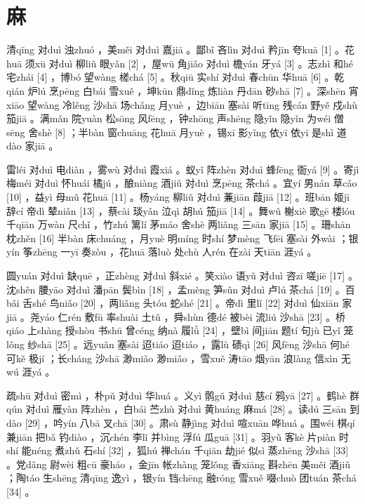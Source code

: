 \documentclass[12pt,UTF8]{ctexbook}
\begin{document}
\chapter{麻}


清qīng 对duì 浊zhuó ，美měi 对duì 嘉jiā 。鄙bǐ 吝lìn 对duì 矜jīn 夸kuā [1] 。花huā 须xū 对duì 柳liǔ 眼yǎn [2] ，屋wū 角jiǎo 对duì 檐yán 牙yá [3] 。志zhì 和hé 宅zhái [4] ，博bó 望wàng 槎chá [5] 。秋qiū 实shí 对duì 春chūn 华huā [6] 。乾qián 炉lú 烹pēng 白bái 雪xuě ，坤kūn 鼎dǐng 炼liàn 丹dān 砂shā [7] 。深shēn 宵xiāo 望wàng 冷lěng 沙shā 场chǎng 月yuè ，边biān 塞sài 听tīng 残cán 野yě 戍shù 笳jiā 。满mǎn 院yuàn 松sōng 风fēng ，钟zhōng 声shēng 隐yǐn 隐yǐn 为wéi 僧sēng 舍shè [8] ；半bàn 窗chuāng 花huā 月yuè ，锡xī 影yǐng 依yī 依yī 是shì 道dào 家jiā 。

雷léi 对duì 电diàn ，雾wù 对duì 霞xiá 。蚁yǐ 阵zhèn 对duì 蜂fēng 衙yá [9] 。寄jì 梅méi 对duì 怀huái 橘jú ，酿niàng 酒jiǔ 对duì 烹pēng 茶chá 。宜yí 男nán 草cǎo [10] ，益yì 母mǔ 花huā [11] 。杨yáng 柳liǔ 对duì 蒹jiān 葭jiā [12] 。班bān 姬jī 辞cí 帝dì 辇niǎn [13] ，蔡cài 琰yǎn 泣qì 胡hú 笳jiā [14] 。舞wǔ 榭xiè 歌gē 楼lóu 千qiān 万wàn 尺chǐ ，竹zhú 篱lí 茅máo 舍shè 两liǎng 三sān 家jiā [15] 。珊shān 枕zhěn [16] 半bàn 床chuáng ，月yuè 明míng 时shí 梦mèng 飞fēi 塞sài 外wài ；银yín 筝zhēng 一yī 奏zòu ，花huā 落luò 处chù 人rén 在zài 天tiān 涯yá 。

圆yuán 对duì 缺quē ，正zhèng 对duì 斜xié 。笑xiào 语yǔ 对duì 咨zī 嗟jiē [17] 。沈shěn 腰yāo 对duì 潘pān 鬓bìn [18] ，孟mèng 笋sǔn 对duì 卢lú 茶chá [19] 。百bǎi 舌shé 鸟niǎo [20] ，两liǎng 头tóu 蛇shé [21] 。帝dì 里lǐ [22] 对duì 仙xiān 家jiā 。尧yáo 仁rén 敷fū 率shuài 土tǔ ，舜shùn 德dé 被bèi 流liú 沙shā [23] 。桥qiáo 上shàng 授shòu 书shū 曾céng 纳nà 履lǚ [24] ，壁bì 间jiān 题tí 句jù 已yǐ 笼lǒng 纱shā [25] 。远yuǎn 塞sài 迢tiáo 迢tiáo ，露lù 碛qì [26] 风fēng 沙shā 何hé 可kě 极jí ；长cháng 沙shā 渺miǎo 渺miǎo ，雪xuě 涛tāo 烟yān 浪làng 信xìn 无wú 涯yá 。

疏shū 对duì 密mì ，朴pǔ 对duì 华huá 。义yì 鹘gǔ 对duì 慈cí 鸦yā [27] 。鹤hè 群qún 对duì 雁yàn 阵zhèn ，白bái 苎zhù 对duì 黄huáng 麻má [28] 。读dú 三sān 到dào [29] ，吟yín 八bā 叉chā [30] 。肃sù 静jìng 对duì 喧xuān 哗huá 。围wéi 棋qí 兼jiān 把bǎ 钓diào ，沉chén 李lǐ 并bìng 浮fú 瓜guā [31] 。羽yǔ 客kè 片piàn 时shí 能néng 煮zhǔ 石shí [32] ，狐hú 禅chán 千qiān 劫jié 似sì 蒸zhēng 沙shā [33] 。党dǎng 尉wèi 粗cū 豪háo ，金jīn 帐zhàng 笼lǒng 香xiāng 斟zhēn 美měi 酒jiǔ ；陶táo 生shēng 清qīng 逸yì ，银yín 铛chēng 融róng 雪xuě 啜chuò 团tuán 茶chá [34] 。
\end{document}
